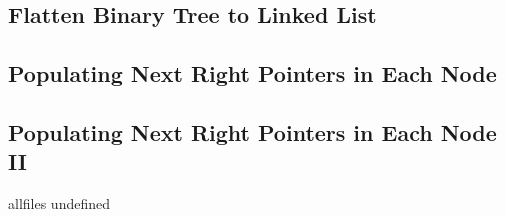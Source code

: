 \documentclass{article}
\begin{document}
\begin{CJK}{UTF8}{gbsn}     %

\else

\subsection{Flatten Binary Tree to Linked List}	

\subsection{Populating Next Right Pointers in Each Node}	

\subsection{Populating Next Right Pointers in Each Node II}	


\fi

\ifx allfiles undefined
\end{CJK}
\end{document}

